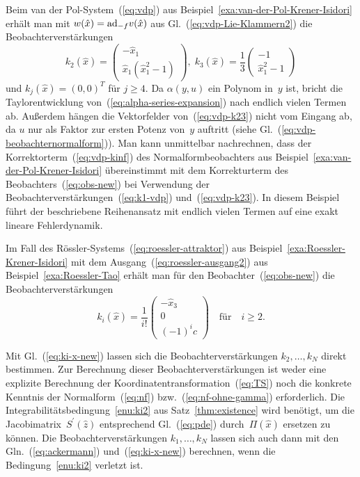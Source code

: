 \begin{example}
\label{exa:vdp-hoehere-Ordnung}Beim van der Pol-System~(\ref{eq:vdp})
aus Beispiel~\ref{exa:van-der-Pol-Krener-Isidori} erhält man mit
$w(\hat{x})={\operatorname{ad}}_{-f}v(\hat{x})$ aus Gl.~(\ref{eq:vdp-Lie-Klammern2})
die Beobachterverstärkungen
\begin{equation}
k_{2}(\hat{x})=\left(\begin{array}{c}
-\hat{x}_{1}\\
\hat{x}_{1}(\hat{x}_{1}^{2}-1)
\end{array}\right),\;k_{3}(\hat{x})=\frac{1}{3}\left(\begin{array}{c}
-1\\
\hat{x}_{1}^{2}-1
\end{array}\right)\label{eq:vdp-k23}
\end{equation}
und $k_{j}(\hat{x})=(0,0)^{T}$ für $j\geq4$. Da $\alpha(y,u)$ ein
Polynom in~$y$ ist, bricht die Taylor\-entwicklung von~(\ref{eq:alpha-series-expansion})
nach endlich vielen Termen ab. Außerdem hängen die Vektor\-felder
von~(\ref{eq:vdp-k23}) nicht vom Eingang ab, da $u$ nur als Faktor
zur ersten Potenz von~$y$ auftritt (siehe Gl.~(\ref{eq:vdp-beobachternormalform})).
Man kann unmittelbar nachrechnen, dass der Korrektorterm~(\ref{eq:vdp-kinf})
des Normalformbeobachters aus Beispiel~\ref{exa:van-der-Pol-Krener-Isidori}
übereinstimmt mit dem Korrekturterm des Beobachters~(\ref{eq:obs-new})
bei Verwendung der Beobachterverstärkungen~(\ref{eq:k1-vdp}) und~(\ref{eq:vdp-k23}).
In diesem Beispiel führt der beschriebene Reihenansatz mit endlich
vielen Termen auf eine exakt lineare Fehlerdynamik.
\end{example}

\begin{example}
\label{exa:roessler-hoehere-Ordnung}Im Fall des Rössler-Systems~(\ref{eq:roessler-attraktor})
aus Beispiel~\ref{exa:Roessler-Krener-Isidori} mit dem Ausgang~(\ref{eq:roessler-ausgang2})
aus Beispiel~\ref{exa:Roessler-Tao} erhält man für den Beobachter~(\ref{eq:obs-new})
die Beobachterverstärkungen 
\[
k_{i}(\hat{x})=\frac{1}{i!}\left(\begin{array}{c}
-\hat{x}_{3}\\
0\\
(-1)^{i}c
\end{array}\right)\quad\mbox{für}\quad i\geq2.
\]
\end{example}

Mit Gl.~(\ref{eq:ki-x-new}) lassen sich die Beobachterverstärkungen
$k_{2},\ldots,k_{N}$ direkt bestimmen. Zur Berechnung dieser Beobachterverstärkungen
ist weder eine explizite Berechnung der Koordinatentransformation~(\ref{eq:TS})
noch die konkrete Kenntnis der Normalform~(\ref{eq:nf}) bzw.~(\ref{eq:nf-ohne-gamma})
erforderlich. Die Integrabilitätsbedingung~\ref{enu:ki2} aus Satz~\ref{thm:existence}
wird benötigt, um die Jacobimatrix~$S^{\prime}(\hat{z})$ entsprechend
Gl.~(\ref{eq:pde}) durch~$\Pi(\hat{x})$ ersetzen zu können. Die
Beobachterverstärkungen $k_{1},\ldots,k_{N}$ lassen sich auch dann
mit den Gln.~(\ref{eq:ackermann}) und~(\ref{eq:ki-x-new}) berechnen,
wenn die Bedingung~\ref{enu:ki2} verletzt ist.

